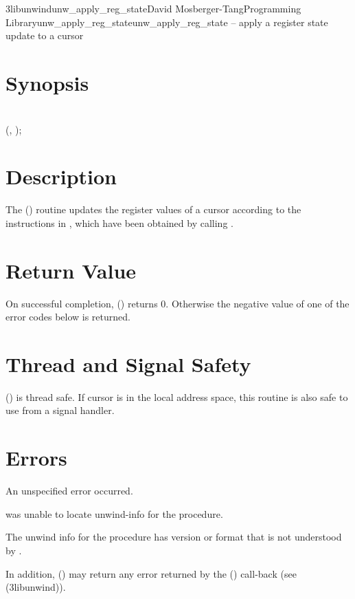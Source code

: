 \documentclass{article}
\begin{document}
\begin{Name}{3libunwind}{unw\_apply\_reg\_state}{David Mosberger-Tang}{Programming Library}{unw\_apply\_reg\_state}unw\_apply\_reg\_state -- apply a register state update to a cursor
\end{Name}

\section{Synopsis}

\\

(,
);\\

\section{Description}

The () routine updates the register values
of a cursor according to the instructions in ,
which have been obtained by calling .

\section{Return Value}

On successful completion, () returns 0.
Otherwise the negative value of one of the error codes below is
returned.

\section{Thread and Signal Safety}

() is thread safe.  If cursor  is
in the local address space, this routine is also safe to use from a
signal handler.

\section{Errors}

\begin{Description}
\item[\Const{UNW\_EUNSPEC}] An unspecified error occurred.
\item[\Const{UNW\_ENOINFO}]  was unable to locate
  unwind-info for the procedure.
\item[\Const{UNW\_EBADVERSION}] The unwind info for the procedure has
  version or format that is not understood by .
\end{Description}
In addition, () may return any error
returned by the () call-back (see
(3libunwind)).
\end{document}
